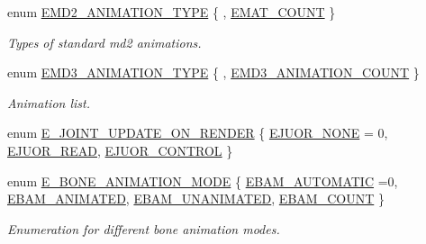 \begin{DoxyCompactItemize}
\item 
enum \hyperlink{namespaceirr_1_1scene_a08d4a84966e1d2886d0d57e4acbb4f19}{E\+M\+D2\+\_\+\+A\+N\+I\+M\+A\+T\+I\+O\+N\+\_\+\+T\+Y\+PE} \{ , \hyperlink{namespaceirr_1_1scene_a08d4a84966e1d2886d0d57e4acbb4f19a5fab9bcda993dba3607011f09f1b7c81}{E\+M\+A\+T\+\_\+\+C\+O\+U\+NT}
 \}\begin{DoxyCompactList}\small\item\em Types of standard md2 animations. \end{DoxyCompactList}
\item 
enum \hyperlink{namespaceirr_1_1scene_ac15a7915ea13336cdc38f1073888fcd3}{E\+M\+D3\+\_\+\+A\+N\+I\+M\+A\+T\+I\+O\+N\+\_\+\+T\+Y\+PE} \{ , \hyperlink{namespaceirr_1_1scene_ac15a7915ea13336cdc38f1073888fcd3a3a9b1ea6dbd3f7a93f66e124496fb6fc}{E\+M\+D3\+\_\+\+A\+N\+I\+M\+A\+T\+I\+O\+N\+\_\+\+C\+O\+U\+NT}
 \}\begin{DoxyCompactList}\small\item\em Animation list. \end{DoxyCompactList}
\item 
enum \hyperlink{namespaceirr_1_1scene_a4a36461b5fa197ca3c6636c043413fa5}{E\+\_\+\+J\+O\+I\+N\+T\+\_\+\+U\+P\+D\+A\+T\+E\+\_\+\+O\+N\+\_\+\+R\+E\+N\+D\+ER} \{ \hyperlink{namespaceirr_1_1scene_a4a36461b5fa197ca3c6636c043413fa5a0f5945f06c8d8399203f155b797ce4a9}{E\+J\+U\+O\+R\+\_\+\+N\+O\+NE} = 0, 
\hyperlink{namespaceirr_1_1scene_a4a36461b5fa197ca3c6636c043413fa5a86ddaa95ce432966c492ecce52e98187}{E\+J\+U\+O\+R\+\_\+\+R\+E\+AD}, 
\hyperlink{namespaceirr_1_1scene_a4a36461b5fa197ca3c6636c043413fa5aaebc2a3dd56293692e21792ed59bbc0f}{E\+J\+U\+O\+R\+\_\+\+C\+O\+N\+T\+R\+OL}
 \}
\item 
enum \hyperlink{namespaceirr_1_1scene_a318162c0a3aad1cf228ed7daddd44801}{E\+\_\+\+B\+O\+N\+E\+\_\+\+A\+N\+I\+M\+A\+T\+I\+O\+N\+\_\+\+M\+O\+DE} \{ \hyperlink{namespaceirr_1_1scene_a318162c0a3aad1cf228ed7daddd44801ad26c52974d12b0f95256af5f9ba11bde}{E\+B\+A\+M\+\_\+\+A\+U\+T\+O\+M\+A\+T\+IC} =0, 
\hyperlink{namespaceirr_1_1scene_a318162c0a3aad1cf228ed7daddd44801a49f9737e748ea0a6fe7e4a636edcdd1b}{E\+B\+A\+M\+\_\+\+A\+N\+I\+M\+A\+T\+ED}, 
\hyperlink{namespaceirr_1_1scene_a318162c0a3aad1cf228ed7daddd44801a5cc55f24b347cbc72b22aff86eb3b18a}{E\+B\+A\+M\+\_\+\+U\+N\+A\+N\+I\+M\+A\+T\+ED}, 
\hyperlink{namespaceirr_1_1scene_a318162c0a3aad1cf228ed7daddd44801a44d54a6246d59a7ab11fc0c4c86ee7ab}{E\+B\+A\+M\+\_\+\+C\+O\+U\+NT}
 \}\begin{DoxyCompactList}\small\item\em Enumeration for different bone animation modes. \end{DoxyCompactList}

\end{DoxyCompactItemize}
